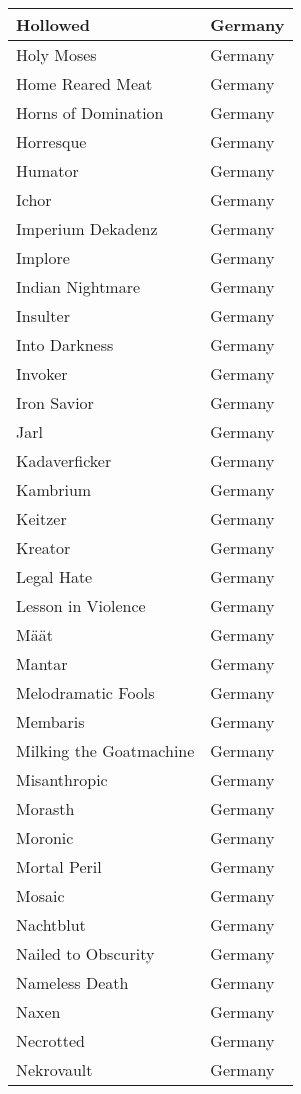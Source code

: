 \documentclass[12pt, a4paper, twoside]{report}
\begin{document}
\begin{center}
\begin{longtable}{|p{5cm}|p{5cm}|}
Hollowed & Germany \\ \hline
Holy Moses & Germany \\ \hline
Home Reared Meat & Germany \\ \hline
Horns of Domination & Germany \\ \hline
Horresque & Germany \\ \hline
Humator & Germany \\ \hline
Ichor & Germany \\ \hline
Imperium Dekadenz & Germany \\ \hline
Implore & Germany \\ \hline
Indian Nightmare & Germany \\ \hline
Insulter & Germany \\ \hline
Into Darkness & Germany \\ \hline
Invoker & Germany \\ \hline
Iron Savior & Germany \\ \hline
Jarl & Germany \\ \hline
Kadaverficker & Germany \\ \hline
Kambrium & Germany \\ \hline
Keitzer & Germany \\ \hline
Kreator & Germany \\ \hline
Legal Hate & Germany \\ \hline
Lesson in Violence & Germany \\ \hline
Määt & Germany \\ \hline
Mantar & Germany \\ \hline
Melodramatic Fools & Germany \\ \hline
Membaris & Germany \\ \hline
Milking the Goatmachine & Germany \\ \hline
Misanthropic & Germany \\ \hline
Morasth & Germany \\ \hline
Moronic & Germany \\ \hline
Mortal Peril & Germany \\ \hline
Mosaic & Germany \\ \hline
Nachtblut & Germany \\ \hline
Nailed to Obscurity & Germany \\ \hline
Nameless Death & Germany \\ \hline
Naxen & Germany \\ \hline
Necrotted & Germany \\ \hline
Nekrovault & Germany \\ \hline

\end{longtable}
\end{center}
\end{document}
